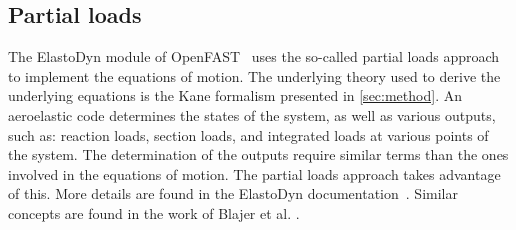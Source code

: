 \documentclass[wes, manuscript]{copernicus}
\renewcommand{\v}[1]{\boldsymbol{#1}}
\newcommand{\m}[1]{\boldsymbol{#1}}
\newcommand{\todoBoth}    [1]{{\colorbox{yellow}{TODO Both:    }}{\color{red}{#1}}\colorbox{yellow}{/}}
\begin{document}


\subsection{Partial loads}
\label{sec:PartialLoads}
The ElastoDyn module of OpenFAST~\citep{OpenFAST} uses the so-called partial loads approach to implement the equations of motion.
The underlying theory used to derive the underlying equations is the Kane formalism presented in \autoref{sec:method}.
An aeroelastic code determines the states of the system, as well as various outputs, such as: reaction loads, section loads, and integrated loads at various points of the system.
The determination of the outputs require similar terms than the ones involved in the equations of motion. 
The partial loads approach takes advantage of this. More details are found in the ElastoDyn documentation~\citep{OpenFAST}. Similar concepts are found in the work of Blajer et al. \citep{Blajer:2005AnAS}.






\end{document}
